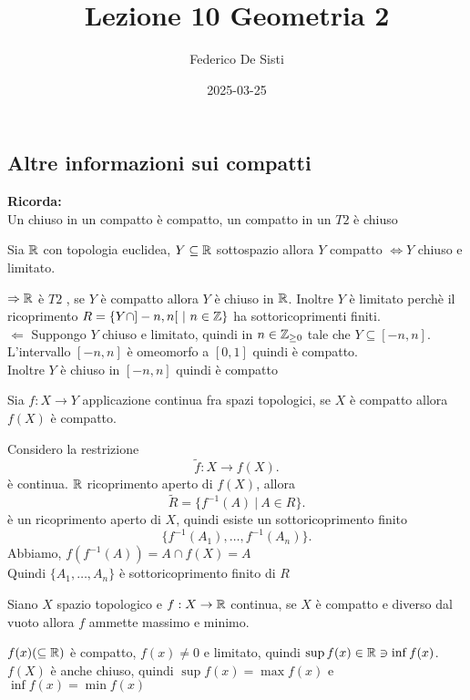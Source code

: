 \documentclass[12px]{article}
\title{Lezione 10 Geometria 2}
\date{2025-03-25}
\author{Federico De Sisti}
\begin{document}
	\maketitle
	\newpage
	\subsection{Altre informazioni sui compatti}
	\textbf{Ricorda:}\\
	Un chiuso in un compatto è compatto, un compatto in un $T2$ è chiuso
	\begin{coro}
		Sia $\mathbb{R}$ con topologia euclidea, $Y\subseteq \mathbb{R}$ sottospazio allora  $Y$ compatto $ \Leftrightarrow Y$ chiuso e limitato.
	\end{coro}
	\begin{dimo}
		$ \Rightarrow \mathbb{R}$ è $T2$ , se $Y$ è compatto allora $Y$ è chiuso in  $\mathbb{R}$. Inoltre  $Y$ è limitato perchè il ricoprimento $R = \{Y\cap ]-n,n[\ |\ n\in\mathbb{Z}\}$ ha sottoricoprimenti finiti.\\
		$ \Leftarrow$ Suppongo $Y$ chiuso e limitato, quindi in $n\in\mathbb{Z}_{\geq 0}$ tale che  $Y\subseteq [-n,n]$.\\
		L'intervallo  $[-n,n] $ è omeomorfo a  $[0,1]$ quindi è compatto.\\
		Inoltre $Y$ è chiuso in $[-n,n]$ quindi è compatto
	\end{dimo}
	\begin{teo}
		Sia $f:X \rightarrow Y$  applicazione continua fra spazi topologici, se $X$ è compatto allora $f(X)$ è compatto.
	\end{teo}
	\begin{dimo}
		Considero la restrizione
		\[
		\tilde f : X \rightarrow f(X)
		.\] 
		è continua. $\mathbb{R}$ ricoprimento aperto di $f(X)$, allora
		 \[
			 \tilde R = \{f^{-1}(A)\ |\ A\in R\}
		.\] 
		è un ricoprimento aperto di $X$, quindi esiste un sottoricoprimento finito
		\[
			\{f^{-1} (A_1),\ldots,f^{-1}(A_n)\}
		.\] 
		Abbiamo, $f(f^{-1}(A)) = A\cap f(X) = A$\\
		Quindi  $\{A_1,\ldots, A_n\}$ è sottoricoprimento finito di $R$
	\end{dimo}
	\begin{coro}
		Siano $X$ spazio topologico e $f: X \rightarrow \mathbb{R}$ continua, se $X$ è compatto e diverso dal vuoto allora $f$ ammette massimo e minimo.
	\end{coro}
	\begin{dimo}
		$f(x)(\subseteq \mathbb{R})$ è compatto, $f(x)\neq 0$ e limitato, quindi  $\sup f(x) \in\mathbb{R}\ni\inf f(x)$. $f(X)$ è anche chiuso, quindi $\sup f(x) = \max f(x)$ e  $\inf f(x) = \min f(x)$
	\end{dimo}
\end{document}
